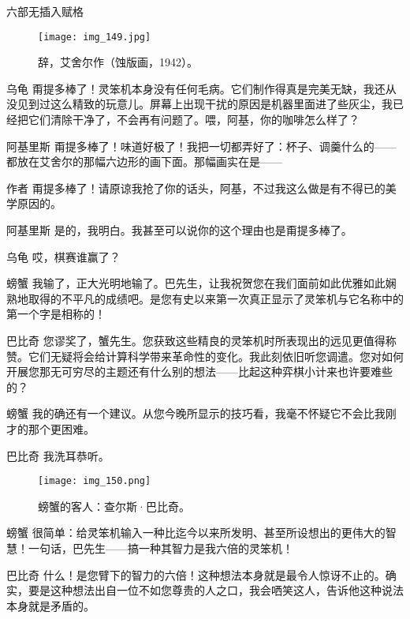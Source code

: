\begin{dialog}{六部无插入赋格}
\begin{dialogue}
\begin{figure}
\texttt{[image: img\_149.jpg]}
\caption[辞，艾舍尔作。]
  {辞，艾舍尔作（蚀版画，1942）。}
\end{figure}

\item[乌龟]甭提多棒了！灵笨机本身没有任何毛病。它们制作得真是完美无缺，我还从没见到过这么精致的玩意儿。屏幕上出现干扰的原因是机器里面进了些灰尘，我已经把它们清除干净了，不会再有问题了。喂，阿基，你的咖啡怎么样了？

\item[阿基里斯]甭提多棒了！味道好极了！我把一切都弄好了：杯子、调羹什么的——都放在艾舍尔的那幅六边形的画下面。那幅画实在是——

\item[作者]甭提多棒了！请原谅我抢了你的话头，阿基，不过我这么做是有不得已的美学原因的。

\item[阿基里斯]是的，我明白。我甚至可以说你的这个理由也是甭提多棒了。

\item[乌龟]哎，棋赛谁赢了？

\item[螃蟹]我输了，正大光明地输了。巴先生，让我祝贺您在我们面前如此优雅如此娴熟地取得的不平凡的成绩吧。是您有史以来第一次真正显示了灵笨机与它名称中的第一个字是相称的！

\item[巴比奇]您谬奖了，蟹先生。您获致这些精良的灵笨机时所表现出的远见更值得称赞。它们无疑将会给计算科学带来革命性的变化。我此刻依旧听您调遣。您对如何开展您那无可穷尽的主题还有什么别的想法——比起这种弈棋小计来也许要难些的？

\item[螃蟹]我的确还有一个建议。从您今晚所显示的技巧看，我毫不怀疑它不会比我刚才的那个更困难。

\item[巴比奇]我洗耳恭听。

\begin{figure}
\texttt{[image: img\_150.png]}
\caption[查尔斯·巴比奇。]
  {螃蟹的客人：查尔斯·巴比奇。}
\end{figure}

\item[螃蟹]很简单：给灵笨机输入一种比迄今以来所发明、甚至所设想出的更伟大的智慧！一句话，巴先生——搞一种其智力是我六倍的灵笨机！

\item[巴比奇]什么！是您臂下的智力的六倍！这种想法本身就是最令人惊讶不止的。确实，要是这种想法出自一位不如您尊贵的人之口，我会哂笑这人，告诉他这种说法本身就是矛盾的。


\end{dialogue}
\end{dialog}
